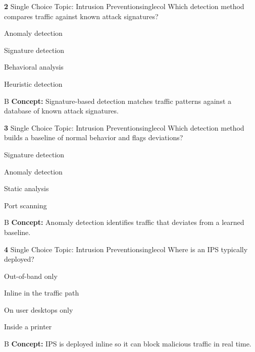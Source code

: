 \documentclass[10pt,a4paper]{article}
\begin{document}
\begin{qcard}{\color{white}\textbf{2} \hfill \small Single Choice \textbar{} Topic: Intrusion Prevention}{singlecol}
Which detection method compares traffic against known attack signatures?

\begin{qoptions}
\item Anomaly detection
\item Signature detection
\item Behavioral analysis
\item Heuristic detection
\end{qoptions}
\begin{explainbox}{B}
\textbf{Concept:} Signature-based detection matches traffic patterns against a database of known attack signatures.
\end{explainbox}
\end{qcard}

\begin{qcard}{\color{white}\textbf{3} \hfill \small Single Choice \textbar{} Topic: Intrusion Prevention}{singlecol}
Which detection method builds a baseline of normal behavior and flags deviations?

\begin{qoptions}
\item Signature detection
\item Anomaly detection
\item Static analysis
\item Port scanning
\end{qoptions}
\begin{explainbox}{B}
\textbf{Concept:} Anomaly detection identifies traffic that deviates from a learned baseline.
\end{explainbox}
\end{qcard}

\begin{qcard}{\color{white}\textbf{4} \hfill \small Single Choice \textbar{} Topic: Intrusion Prevention}{singlecol}
Where is an IPS typically deployed?

\begin{qoptions}
\item Out-of-band only
\item Inline in the traffic path
\item On user desktops only
\item Inside a printer
\end{qoptions}
\begin{explainbox}{B}
\textbf{Concept:} IPS is deployed inline so it can block malicious traffic in real time.
\end{explainbox}
\end{qcard}
\end{document}
